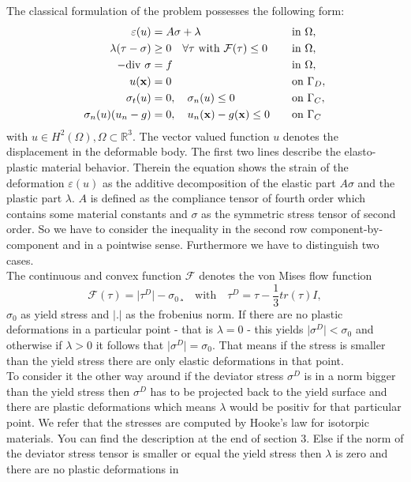 \documentclass{article}
\begin{document}
The classical formulation of the problem possesses the following form:
\begin{align*}
 \varepsilon(u) &= A\sigma + \lambda & &\quad\text{in } \Omega,\\
 \lambda(\tau - \sigma) &\geq 0\quad\forall\tau\text{ with
 }\mathcal{F}(\tau)\leq 0 & &\quad\text{in } \Omega,\\
 -\textrm{\textrm{div}}\ \sigma &= f & &\quad\text{in } \Omega,\\
 u(\mathbf x) &= 0 & &\quad\text{on }\Gamma_D,\\
 \sigma_t(u) &= 0,\quad\sigma_n(u)\leq 0 & &\quad\text{on }\Gamma_C,\\
\sigma_n(u)(u_n - g) &= 0,\quad u_n(\mathbf x) - g(\mathbf x) \leq 0 & &\quad\text{on } \Gamma_C
\end{align*}
with $u\in H^2(\Omega),\Omega\subset\mathbb{R}^3$.  The vector valued
function $u$ denotes the displacement in the deformable body. The first two lines describe the
elasto-plastic material behavior. Therein the equation shows the
strain of the deformation $\varepsilon (u)$ as the additive decomposition of the
elastic part $A\sigma$ and the plastic part $\lambda$. $A$ is defined as the compliance tensor of fourth order which contains some material constants and $\sigma$ as the
symmetric stress tensor of second order. So we have to consider the inequality in the second
row component-by-component and in a pointwise sense. Furthermore we have to
distinguish two cases.\\
The continuous and convex function $\mathcal{F}$ denotes the von Mises flow function
$$\mathcal{F}(\tau) = \vert\tau^D\vert - \sigma_0¸\quad\text{with}\quad \tau^D
= \tau - \dfrac{1}{3}tr(\tau)I,$$
$\sigma_0$ as yield stress and $\vert .\vert$ as the frobenius norm. If there
are no plastic deformations in a particular point - that is $\lambda=0$ - this yields $\vert\sigma^D\vert <
\sigma_0$ and otherwise if $\lambda > 0$ it follows that $\vert\sigma^D\vert = \sigma_0$.
That means if the stress is smaller than the yield stress there are only elastic
deformations in that point.\\
To consider it the other way around if the deviator stress $\sigma^D$ is in a
norm bigger than the yield stress then $\sigma^D$ has to be projected back to the yield surface and there are plastic deformations which means $\lambda$
would be positiv for that particular point. We refer that the stresses are
computed by Hooke's law for isotorpic materials. You can find the description at the end of section 3. Else if the norm of the deviator stress tensor is smaller or equal the yield stress then $\lambda$ is zero and there are no plastic deformations in
\end{document}
